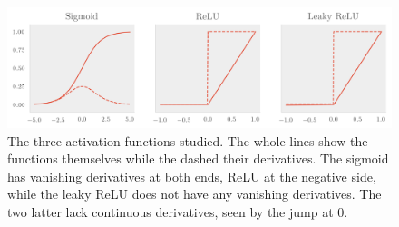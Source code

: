 \begin{figure}[]
  \centering
  \includegraphics[]{figures/activations.png}
  \caption{\label{fig:activations} The three activation functions studied. The
    whole lines show the functions themselves while the dashed their
    derivatives. The sigmoid has vanishing derivatives at both ends, ReLU at the
  negative side, while the leaky ReLU does not have any vanishing derivatives.
  The two latter lack continuous derivatives, seen by the jump at 0.}
\end{figure}

